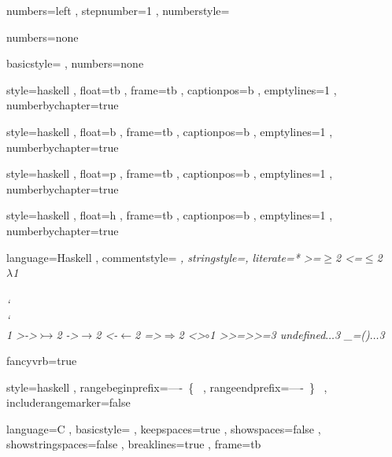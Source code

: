 \usepackage{xcolor}
\usepackage{fancyvrb}
\usepackage[scaled]{beramono}


    { numbers=left
    , stepnumber=1
    , numberstyle=\tiny
    }

    { numbers=none
    }

    {
    }

    { basicstyle=\color{red}\ttfamily
    , numbers=none
    }

    { style=haskell
    , float=tb
    , frame=tb
    , captionpos=b
    , emptylines=1
    , numberbychapter=true
    }

    { style=haskell
    , float=b
    , frame=tb
    , captionpos=b
    , emptylines=1
    , numberbychapter=true
    }

    { style=haskell
    , float=p
    , frame=tb
    , captionpos=b
    , emptylines=1
    , numberbychapter=true
    }

    { style=haskell
    , float=h
    , frame=tb
    , captionpos=b
    , emptylines=1
    , numberbychapter=true
    }

    { language=Haskell
    , commentstyle=\color[rgb]{0.38,0.63,0.69}\itshape
    , stringstyle=\textcolor[rgb]{0.25,0.44,0.63}
    , literate=*
        {>=}{{$\geq$}}2
        {<=}{{$\leq$}}2
        {\\}{{$\lambda$}}1
        {\\\\}{{\char`\\\char`\\}}1
        {>->}{{$\rightarrowtail$}}2
        {->}{{$\rightarrow$}}2
        {<-}{{$\leftarrow$}}2
        {=>}{{$\Rightarrow$}}2
        {<>}{{$\circ$}}1
        {>>=}{{>>=}}3
        {undefined}{{$\ldots$}}3
        {_=()}{{$\ldots$}}3
    }

    { fancyvrb=true
    }

    { style=haskell
    , rangebeginprefix=----\ \{\ %
    , rangeendprefix=----\ \}\ %
    , includerangemarker=false
    }

\lstset
    { language=C
    , basicstyle=\fontsize{8}{10}\ttfamily
    , keepspaces=true
    , showspaces=false
    , showstringspaces=false
    , breaklines=true
    , frame=tb
    }
\lstset{ style=numbers
       , captionpos=b
       }
